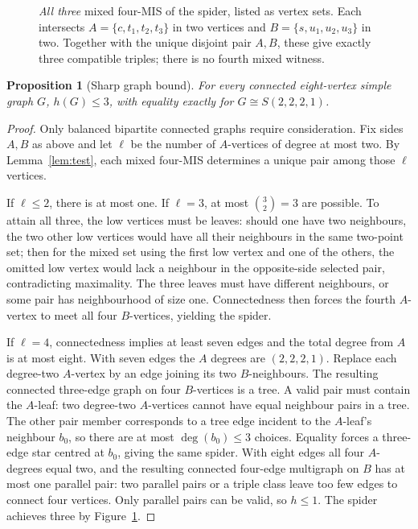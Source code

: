 \documentclass[12pt,a4paper]{article}
\newtheorem{proposition}[theorem]{Proposition}
\newcommand{\bin}[2]{\binom{#1}{#2}}
\begin{document}
\begin{figure}[htbp]\centering
{}
\caption{\emph{All three} mixed four-MIS of the spider, listed as vertex sets. Each intersects $A=\{c,t_1,t_2,t_3\}$ in two vertices and $B=\{s,u_1,u_2,u_3\}$ in two. Together with the unique disjoint pair $A,B$, these give exactly three compatible triples; there is no fourth mixed witness.}\label{fig:witnesses}
\end{figure}

\begin{proposition}[Sharp graph bound]\label{prop:sharp}
For every connected eight-vertex simple graph $G$, $h(G)\le3$, with equality exactly for $G\cong S(2,2,2,1)$.
\end{proposition}
\begin{proof}
Only balanced bipartite connected graphs require consideration. Fix sides $A,B$ as above and let $\ell$ be the number of $A$-vertices of degree at most two. By Lemma~\ref{lem:test}, each mixed four-MIS determines a unique pair among those $\ell$ vertices.

If $\ell\le2$, there is at most one. If $\ell=3$, at most $\bin{3}{2}=3$ are possible. To attain all three, the low vertices must be leaves: should one have two neighbours, the two other low vertices would have all their neighbours in the same two-point set; then for the mixed set using the first low vertex and one of the others, the omitted low vertex would lack a neighbour in the opposite-side selected pair, contradicting maximality. The three leaves must have different neighbours, or some pair has neighbourhood of size one. Connectedness then forces the fourth $A$-vertex to meet all four $B$-vertices, yielding the spider.

If $\ell=4$, connectedness implies at least seven edges and the total degree from $A$ is at most eight. With seven edges the $A$ degrees are $(2,2,2,1)$. Replace each degree-two $A$-vertex by an edge joining its two $B$-neighbours. The resulting connected three-edge graph on four $B$-vertices is a tree. A valid pair must contain the $A$-leaf: two degree-two $A$-vertices cannot have equal neighbour pairs in a tree. The other pair member corresponds to a tree edge incident to the $A$-leaf's neighbour $b_0$, so there are at most $\deg(b_0)\le3$ choices. Equality forces a three-edge star centred at $b_0$, giving the same spider. With eight edges all four $A$-degrees equal two, and the resulting connected four-edge multigraph on $B$ has at most one parallel pair: two parallel pairs or a triple class leave too few edges to connect four vertices. Only parallel pairs can be valid, so $h\le1$. The spider achieves three by Figure~\ref{fig:witnesses}.
\end{proof}
\end{document}
